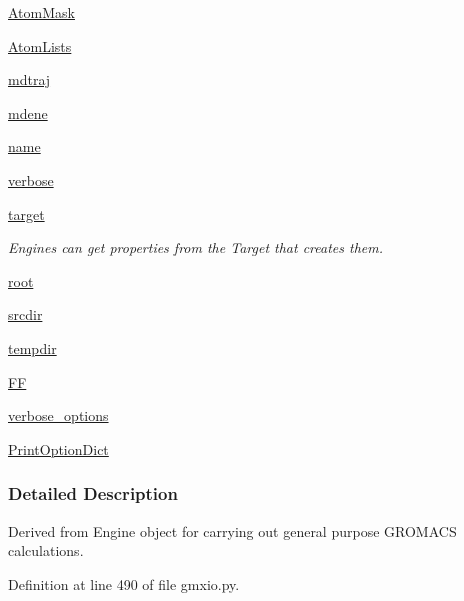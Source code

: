 \begin{DoxyCompactItemize}
\hyperlink{classforcebalance_1_1gmxio_1_1GMX_a9503a409fe32d337e8b6f89806185ba3}{Atom\-Mask}
\item 
\hyperlink{classforcebalance_1_1gmxio_1_1GMX_a1959c66297d10f4333e5dd85f3eba012}{Atom\-Lists}
\item 
\hyperlink{classforcebalance_1_1gmxio_1_1GMX_a0ce958adec74c9602c09966b97f73fce}{mdtraj}
\item 
\hyperlink{classforcebalance_1_1gmxio_1_1GMX_aac07f444362990947780108c7fe0be92}{mdene}
\item 
\hyperlink{classforcebalance_1_1engine_1_1Engine_add3a4bf15527832034d88fb692a37115}{name}
\item 
\hyperlink{classforcebalance_1_1engine_1_1Engine_a29b97ebf8984e50fd19eb831715ab659}{verbose}
\item 
\hyperlink{classforcebalance_1_1engine_1_1Engine_a1fdd29fbd127cba331326a3557558e2a}{target}
\begin{DoxyCompactList}\small\item\em Engines can get properties from the Target that creates them. \end{DoxyCompactList}\item 
\hyperlink{classforcebalance_1_1engine_1_1Engine_a82e9382a3316d3e26ef29efb58db4a00}{root}
\item 
\hyperlink{classforcebalance_1_1engine_1_1Engine_ad9c499329de6299f0b8acf898d71e7d5}{srcdir}
\item 
\hyperlink{classforcebalance_1_1engine_1_1Engine_a7bb2deae7ee926f0df7758a92b382515}{tempdir}
\item 
\hyperlink{classforcebalance_1_1engine_1_1Engine_aeb55142568e89f7a92d745e04ec3c964}{F\-F}
\item 
\hyperlink{classforcebalance_1_1BaseClass_afd68efa29ccd2f320f4cf82198214aac}{verbose\-\_\-options}
\item 
\hyperlink{classforcebalance_1_1BaseClass_afc6659278497d7245bc492ecf405ccae}{Print\-Option\-Dict}
\end{DoxyCompactItemize}


\subsubsection{Detailed Description}
Derived from Engine object for carrying out general purpose G\-R\-O\-M\-A\-C\-S calculations. 



Definition at line 490 of file gmxio.\-py.



